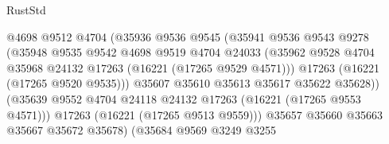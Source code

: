 \begin{lexlean}{RustStd}
\begin{coremodule}
                                        @4698
                                        @9512
                                        @4704
                                        (@35936
                                          @9536
                                          @9545
                                          (@35941
                                            @9536
                                            @9543
                                            @9278
                                            (@35948
                                              @9535
                                              @9542
                                              @4698
                                              @9519
                                              @4704
                                              @24033
                                              (@35962
                                                @9528
                                                @4704
                                                @35968
                                                @24132
                                                @17263
                                                (@16221 (@17265 @9529 @4571)))
                                              @17263
                                              (@16221 (@17265 @9520 @9535)))
                                            @35607
                                            @35610
                                            @35613
                                            @35617
                                            @35622
                                            @35628))
                                        (@35639
                                          @9552
                                          @4704
                                          @24118
                                          @24132
                                          @17263
                                          (@16221 (@17265 @9553 @4571)))
                                        @17263
                                        (@16221 (@17265 @9513 @9559)))
                                      @35657
                                      @35660
                                      @35663
                                      @35667
                                      @35672
                                      @35678)
                                    (@35684
                                      @9569
                                      @3249
                                      @3255

\end{coremodule}
\end{lexlean}

